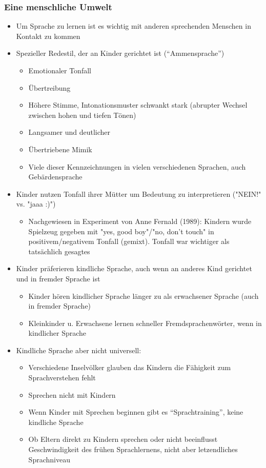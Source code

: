 \subsubsection{Eine menschliche Umwelt}
\begin{itemize}
	\item
		Um Sprache zu lernen ist es wichtig mit anderen sprechenden Menschen in Kontakt zu kommen
	\item
		Spezieller Redestil, der an Kinder gerichtet ist (\enquote{Ammensprache})
		\begin{itemize}
			\item
				Emotionaler Tonfall
			\item
				Übertreibung
			\item
				Höhere Stimme, Intonationsmuster schwankt stark (abrupter Wechsel zwischen hohen und tiefen Tönen)
			\item
				Langsamer und deutlicher
			\item
				Übertriebene Mimik
			\item
				Viele dieser Kennzeichnungen in vielen verschiedenen Sprachen, auch Gebärdensprache
		\end{itemize}
	\item
		Kinder nutzen Tonfall ihrer Mütter um Bedeutung zu interpretieren ("NEIN!" vs. "jaaa :)")
		\begin{itemize}
			\item
				Nachgewiesen in Experiment von Anne Fernald (1989): Kindern wurde Spielzeug gegeben mit "yes, good boy"/"no, don't touch" in positivem/negativem Tonfall (gemixt). Tonfall war wichtiger als tatsächlich gesagtes
		\end{itemize}
	\item
		Kinder präferieren kindliche Sprache, auch wenn an anderes Kind gerichtet und in fremder Sprache ist
		\begin{itemize}
			\item
				Kinder hören kindlicher Sprache länger zu als erwachsener Sprache (auch in fremder Sprache)
			\item
			 	Kleinkinder u. Erwachsene lernen schneller Fremdsprachenwörter, wenn in kindlicher Sprache
		\end{itemize}
	\item
		Kindliche Sprache aber nicht universell:
		\begin{itemize}
			\item
				Verschiedene Inselvölker glauben das Kindern die Fähigkeit zum Sprachverstehen fehlt
			\item
				Sprechen nicht mit Kindern
			\item
				Wenn Kinder mit Sprechen beginnen gibt es \enquote{Sprachtraining}, keine kindliche Sprache
	\item
		Ob Eltern direkt zu Kindern sprechen oder nicht beeinflusst Geschwindigkeit des frühen Sprachlernens, nicht aber letzendliches Sprachniveau
		\end{itemize}
\end{itemize}

